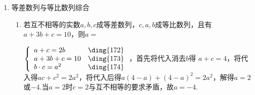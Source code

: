 \begin{enumerate}
\begin{enumerate}
\begin{jieda}
\begin{enumerate}
\begin{enumerate}[1.]
                \item $d = -81, e = 9$，$a+b+c+d+e = 201$
                \item $d = -81, e = -9$，$a+b+c+d+e = 183$
            \end{enumerate}
        \end{enumerate}
    \end{jieda}
    \item 已知正项等比数列$\{a_n\}$的公比不是1，则
    \begin{jieda}
        $(a_2 + a_8) - (a_3 + a_7) = (a_2-a_3)+(a_8-a_7) = a_2(1-q)+a_7(q-1) = (a_2-a_7)(1-q) = a_2(1-q^5)(1-q)$
            
        易知$(1-q^5)(1-q) > 0$在$q > 0$且$q \neq 1$时恒成立，因此$a_2 + a_8 > a_3 + a_7$恒成立.
    \end{jieda}
    \item 若等比数列$\{a_n\}$的公比$q < 0$，前$n$项和为$S_n$则$S_8a_9$与$a_8S_9$的大小关系是
    \begin{jieda}
        $a_8S_9 = a_8(a_1 + qS_8) = a_1a_8 + S_8a_9$\\
        因为等比数列$\{a_n\}$的公比$q < 0$，所以$a_1a_8 < 0$，故$S_8a_9 > a_8S_9$
    \end{jieda}
    \end{enumerate}
    \item 等差数列与等比数列综合
    \begin{enumerate}
        \item 若互不相等的实数$a, b, c$成等差数列，$c, a, b$成等比数列，且有$a+3b+c = 10$，则$a = $
        \begin{jieda}
            $\left \{ \begin{array}{ll}
                 a+c = 2b & \mbox{\ding{172}} \\
                 a+3b+c = 10 & \mbox{\ding{173}} \\
                 b \cdot c = a^2& \mbox{\ding{174}}
            \end{array}\right .$，首先将代入消去$b$得 $a+c = 4$，将代入得$ac + c^2 = 2a^2$，将代入后得$a(4-a) + (4-a)^2 = 2a^2$，解得$a = 2$或$-4$.当$a = 2$时$c = 2$与互不相等的要求矛盾，故$a = -4$.
        \end{jieda}

\end{enumerate}
\end{enumerate}
